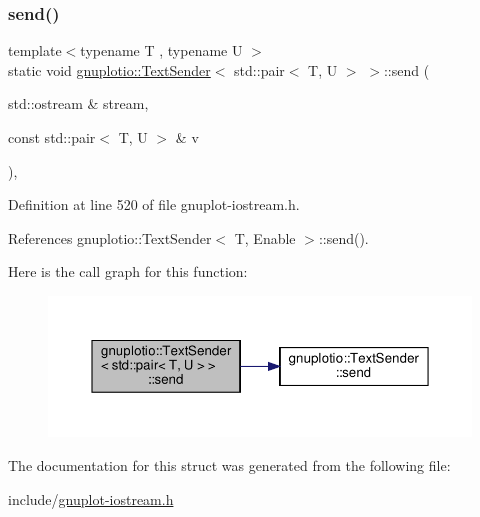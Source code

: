 \subsubsection{\texorpdfstring{send()}{send()}}
{\footnotesize\ttfamily template$<$typename T , typename U $>$ \\
static void \hyperlink{structgnuplotio_1_1_text_sender}{gnuplotio\+::\+Text\+Sender}$<$ std\+::pair$<$ T, U $>$ $>$\+::send (\begin{DoxyParamCaption}\item[{std\+::ostream \&}]{stream,  }\item[{const std\+::pair$<$ T, U $>$ \&}]{v }\end{DoxyParamCaption})\hspace{0.3cm}{\ttfamily [inline]}, {\ttfamily [static]}}



Definition at line 520 of file gnuplot-\/iostream.\+h.



References gnuplotio\+::\+Text\+Sender$<$ T, Enable $>$\+::send().

Here is the call graph for this function\+:\nopagebreak
\begin{figure}[H]
\begin{center}
\leavevmode
\includegraphics[width=350pt]{structgnuplotio_1_1_text_sender_3_01std_1_1pair_3_01_t_00_01_u_01_4_01_4_ae1f3a6ffd8a60bb73d787578327154d1_cgraph}
\end{center}
\end{figure}


The documentation for this struct was generated from the following file\+:\begin{DoxyCompactItemize}
\item 
include/\hyperlink{gnuplot-iostream_8h}{gnuplot-\/iostream.\+h}\end{DoxyCompactItemize}
